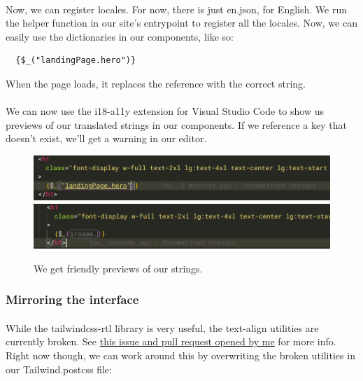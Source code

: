 \documentclass{report}
\begin{document}
\paragraph{}
Now, we can register locales. For now, there is just en.json, for English. We run the helper function in our site's entrypoint to register all the locales. Now, we can easily use the dictionaries in our components, like so:

\begin{verbatim}
  {$_("landingPage.hero")}
\end{verbatim}
When the page loads, it replaces the reference with the correct string.

\paragraph{}
We can now use the i18-a11y extension for Visual Studio Code to show us previews of our translated strings in our components. If we reference a key that doesn't exist, we'll get a warning in our editor.

\begin{figure}[H]
  \includegraphics[width=\linewidth]{./media/development/frontend/localisation/no_ext.png}
  \includegraphics[width=\linewidth]{./media/development/frontend/localisation/with_ext.png}
  \label{fig:localisation1}
  \caption{We get friendly previews of our strings.}
\end{figure}

\subsubsection{Mirroring the interface}
\paragraph{}
While the tailwindcss-rtl library is very useful, the text-align utilities are currently broken. See \href{https://github.com/20lives/tailwindcss-rtl/issues/39}{this issue and pull request opened by me} for more info. Right now though, we can work around this by overwriting the broken utilities in our Tailwind.postcss file:
\end{document}
